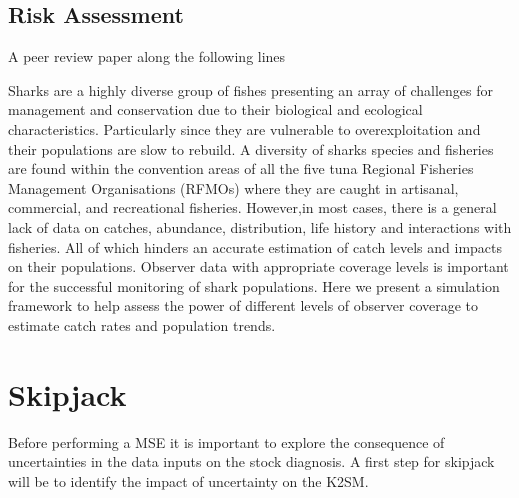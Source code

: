 \documentclass[a4paper,10pt]{article}
\begin{document}
\subsection{Risk Assessment}

A peer review paper  along the following lines

Sharks are a highly diverse group of fishes presenting an array of challenges for management and 
conservation due to their biological and ecological characteristics. Particularly since they are 
vulnerable to overexploitation and their populations are slow to rebuild. A diversity of sharks 
species and fisheries are found within the convention areas of all the five tuna Regional Fisheries 
Management Organisations (RFMOs) where they are caught in artisanal, commercial, and recreational 
fisheries. However,in most cases, there is a general lack of data on catches, abundance, distribution, 
life history and interactions with fisheries. All of which hinders an accurate estimation of catch 
levels and impacts on their populations. Observer data with appropriate coverage levels is important for the successful monitoring of 
shark populations. Here we present a simulation framework to help assess the power of different levels of 
observer coverage to estimate catch rates and population trends.

\section{Skipjack}

Before performing a MSE it is important to explore the consequence of uncertainties in the data inputs on the stock diagnosis.
A first step for skipjack will be to identify the impact of uncertainty on the K2SM.

\end{document}
